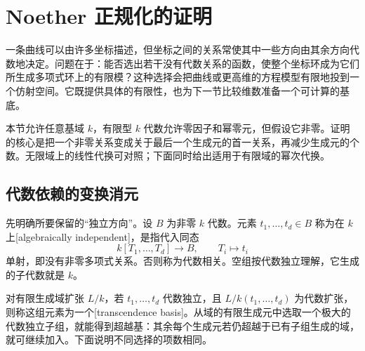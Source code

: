
% 
% 

\section{Noether 正规化的证明}
\label{g5:sec:0302}

一条曲线可以由许多坐标描述，但坐标之间的关系常使其中一些方向由其余方向代数地决定。问题在于：能否选出若干没有代数关系的函数，使整个坐标环成为它们所生成多项式环上的有限模？这种选择会把曲线或更高维的方程模型有限地投到一个仿射空间。它既提供具体的有限性，也为下一节比较维数准备一个可计算的基底。

\ProseParagraphBreak

本节允许任意基域 \(k\)，有限型 \(k\) 代数允许零因子和幂零元，但假设它非零。证明的核心是把一个非零关系变成关于最后一个生成元的首一关系，再减少生成元的个数。无限域上的线性代换可对照\cite[第33节，引理2，第262页]{Matsumura1989}；下面同时给出适用于有限域的幂次代换。

\subsection{代数依赖的变换消元}
\label{g5:subsec:0302:01}

先明确所要保留的“独立方向”。设 \(B\) 为非零 \(k\) 代数。元素 \(t_1,\ldots,t_d\in B\) 称为在 \(k\) 上[algebraically independent]，是指代入同态
\[
	k[T_1,\ldots,T_d]\longrightarrow B,\qquad T_i\longmapsto t_i
\]
单射，即没有非零多项式关系。否则称为代数相关。空组按代数独立理解，它生成的子代数就是 \(k\)。

\ProseParagraphBreak

对有限生成域扩张 \(L/k\)，若 \(t_1,\ldots,t_d\) 代数独立，且 \(L/k(t_1,\ldots,t_d)\) 为代数扩张，则称这组元素为一个[transcendence basis]。从域的有限生成元中选取一个极大的代数独立子组，就能得到超越基：其余每个生成元若仍超越于已有子组生成的域，就可继续加入。下面说明不同选择的项数相同。

